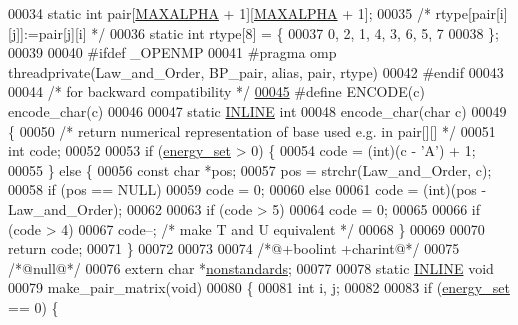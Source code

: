 \begin{DoxyCode}
00034 \textcolor{keyword}{static} \textcolor{keywordtype}{int}    pair[\mbox{\hyperlink{pair__mat_8h_a05a5ffe718aa431d97419a12fb082379}{MAXALPHA}} + 1][\mbox{\hyperlink{pair__mat_8h_a05a5ffe718aa431d97419a12fb082379}{MAXALPHA}} + 1];
00035 \textcolor{comment}{/* rtype[pair[i][j]]:=pair[j][i] */}
00036 \textcolor{keyword}{static} \textcolor{keywordtype}{int}    rtype[8] = \{
00037   0, 2, 1, 4, 3, 6, 5, 7
00038 \};
00039 
00040 \textcolor{preprocessor}{#ifdef \_OPENMP}
00041 \textcolor{preprocessor}{#pragma omp threadprivate(Law\_and\_Order, BP\_pair, alias, pair, rtype)}
00042 \textcolor{preprocessor}{#endif}
00043 
00044 \textcolor{comment}{/* for backward compatibility */}
\mbox{\hyperlink{pair__mat_8h_a5912bdb117c9444d0129c2cb2e8e5f77}{00045}} \textcolor{preprocessor}{#define ENCODE(c) encode\_char(c)}
00046 
00047 \textcolor{keyword}{static} \mbox{\hyperlink{pair__mat_8h_a2eb6f9e0395b47b8d5e3eeae4fe0c116}{INLINE}} \textcolor{keywordtype}{int}
00048 encode\_char(\textcolor{keywordtype}{char} c)
00049 \{
00050   \textcolor{comment}{/* return numerical representation of base used e.g. in pair[][] */}
00051   \textcolor{keywordtype}{int} code;
00052 
00053   \textcolor{keywordflow}{if} (\mbox{\hyperlink{group__model__details_gafb1ef1166da85092ae8a325e02dcae71}{energy\_set}} > 0) \{
00054     code = (int)(c - \textcolor{charliteral}{'A'}) + 1;
00055   \} \textcolor{keywordflow}{else} \{
00056     \textcolor{keyword}{const} \textcolor{keywordtype}{char} *pos;
00057     pos = strchr(Law\_and\_Order, c);
00058     \textcolor{keywordflow}{if} (pos == NULL)
00059       code = 0;
00060     \textcolor{keywordflow}{else}
00061       code = (int)(pos - Law\_and\_Order);
00062 
00063     \textcolor{keywordflow}{if} (code > 5)
00064       code = 0;
00065 
00066     \textcolor{keywordflow}{if} (code > 4)
00067       code--;           \textcolor{comment}{/* make T and U equivalent */}
00068   \}
00069 
00070   \textcolor{keywordflow}{return} code;
00071 \}
00072 
00073 
00074 \textcolor{comment}{/*@+boolint +charint@*/}
00075 \textcolor{comment}{/*@null@*/}
00076 \textcolor{keyword}{extern} \textcolor{keywordtype}{char} *\mbox{\hyperlink{pair__mat_8h_a2695d91cc535d09c2eae5c3884e2ec64}{nonstandards}};
00077 
00078 \textcolor{keyword}{static} \mbox{\hyperlink{pair__mat_8h_a2eb6f9e0395b47b8d5e3eeae4fe0c116}{INLINE}} \textcolor{keywordtype}{void}
00079 make\_pair\_matrix(\textcolor{keywordtype}{void})
00080 \{
00081   \textcolor{keywordtype}{int} i, j;
00082 
00083   \textcolor{keywordflow}{if} (\mbox{\hyperlink{group__model__details_gafb1ef1166da85092ae8a325e02dcae71}{energy\_set}} == 0) \{

\end{DoxyCode}
